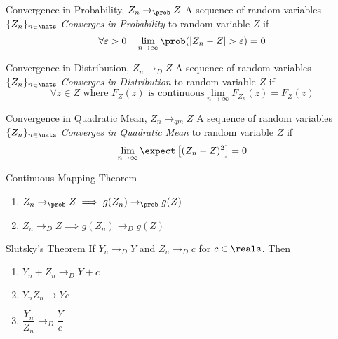 \documentclass[11pt,a4paper]{article}
\begin{document}
\begin{definition}{Convergence in Probability, $Z_n\to_\prob Z$}
A sequence of random variables $\{Z_n\}_{n\in\nats}$ \textit{Converges in Probability} to random variable $Z$ if
\[ \forall\varepsilon>0\quad\lim_{n\to\infty}\prob(|Z_n-Z|>\varepsilon)=0 \]
\end{definition}

\begin{definition}{Convergence in Distribution, $Z_n\to_D Z$}
A sequence of random variables $\{Z_n\}_{n\in\nats}$ \textit{Converges in Distribution} to random variable $Z$ if
\[ \forall z\in Z\text{ where }F_Z(z)\text{ is continuous} \lim_{n\to\infty}F_{Z_n}(z)=F_Z(z)\]
\end{definition}

\begin{definition}{Convergence in Quadratic Mean, $Z_n\to_{qm}Z$}
A sequence of random variables $\{Z_n\}_{n\in\nats}$ \textit{Converges in Quadratic Mean} to random variable $Z$ if
\[ \lim_{n\to\infty}\expect\left[(Z_n-Z)^2\right]=0 \]
\end{definition}


\begin{theorem}{Continuous Mapping Theorem}
  \begin{enumerate}
    \item $Z_n\to_\prob Z\implies g(Z_n)\to_\prob g(Z)$
    \item $Z_n\to_D Z\implies g(Z_n)\to_D g(Z)$
  \end{enumerate}
\end{theorem}

\begin{theorem}{Slutsky's Theorem}
If $Y_n\to_DY$ and $Z_n\to_Dc$ for $c\in\reals$. Then
  \begin{enumerate}
    \item $Y_n+Z_n\to_DY+c$
    \item $Y_nZ_n\to Yc$
    \item $\dfrac{Y_n}{Z_n}\to_D\dfrac{Y}c$
  \end{enumerate}
\end{theorem}
\end{document}
